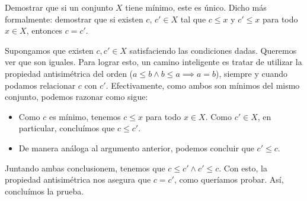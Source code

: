 \begin{problem}{}{}

    Demostrar que si un conjunto $X$ tiene mínimo, este es único.
    Dicho más formalmente:
    demostrar que si existen $c$, $c' \in X$ tal que $c \leq x$ y $c' \leq x$ para todo $x \in X$,
    entonces $c = c'$.

\end{problem}
\vspace{1ex}

Supongamos que existen $c, c' \in X$ satisfaciendo las condiciones dadas.
Queremos ver que son iguales.
Para lograr esto, un camino inteligente es tratar de utilizar la propiedad antisimétrica del orden ($a \le b \land b \le a \implies a = b$), siempre y cuando podamos relacionar $c$ con $c'$.
Efectivamente, como ambos son mínimos del mismo conjunto, podemos razonar como sigue:

\begin{itemize}
    \item Como $c$ es mínimo, tenemos $c \le x$ para todo $x \in X$. Como $c' \in X$, en particular, concluímos que $c \le c'$.
    \item De manera análoga al argumento anterior, podemos concluir que $c' \le c$.
\end{itemize}

Juntando ambas conclusionem, tenemos que $c \le c' \land c' \le c$.
Con esto, la propiedad antisimétrica nos asegura que $c = c'$, como queríamos probar.
Así, concluímos la prueba.
